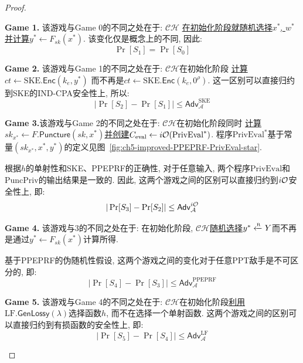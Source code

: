 \begin{proof}
\begin{trivlist}
\item \textbf{Game 1.} 该游戏与Game 0的不同之处在于: $\mathcal{CH}$ 
    \underline{在初始化阶段就随机选择$x^*$, $w^*$并计算$y^* \leftarrow F_{sk}(x^*)$}. 
    该变化仅是概念上的不同, 因此: 
\begin{equation*}
    \Pr[S_1] = \Pr[S_0]
\end{equation*} 

\item \textbf{Game 2.} 该游戏与Game 1的不同之处在于: $\mathcal{CH}$在初始化阶段
    \underline{计算$ct \leftarrow \text{SKE}.\mathsf{Enc}(k_e, y^*)$} 
    而不再是$ct \leftarrow \text{SKE}.\mathsf{Enc}(k_e, 0^\rho)$. 
    这一区别可以直接归约到SKE的IND-CPA安全性上, 所以: 
\begin{equation*}
    |\Pr[S_2] - \Pr[S_1]| \leq \mathsf{Adv}_\mathcal{A}^{\text{SKE}}
\end{equation*}   

\item \textbf{Game 3.}该游戏与Game 2的不同之处在于: $\mathcal{CH}$在初始化阶段同时 
    \underline{计算$sk_{x^*} \leftarrow F.\mathsf{Puncture}(sk, x^*)$并创建$C_\text{eval} \leftarrow i\mathcal{O}(\text{PrivEval}^*)$}. 
    程序$\text{PrivEval}^*$基于常量$(sk_{x^*}, x^*, y^*)$的定义见图~\ref{fig:ch5-improved-PPEPRF-PrivEval-star}. 

    根据$h$的单射性和SKE、PPEPRF的正确性, 
    对于任意输入, 两个程序$\text{PrivEval}$和$\text{PuncPriv}$的输出结果是一致的. 
    因此, 这两个游戏之间的区别可以直接归约到$i\mathcal{O}$安全性上, 即:
\begin{equation*}
    |\Pr[S_3] - \Pr[S_2]| \leq \mathsf{Adv}_\mathcal{A}^{i\mathcal{O}} 
\end{equation*} 

\item \textbf{Game 4.} 该游戏与3的不同之处在于: 在初始化阶段, $\mathcal{CH}$\underline{随机选择$y^* \xleftarrow{\textup{\tiny R}} Y$}而不再是通过$y^* \leftarrow F_{sk}(x^*)$计算所得. 

    基于PPEPRF的伪随机性假设, 这两个游戏之间的变化对于任意PPT敌手是不可区分的, 即: 
\begin{equation*}
    |\Pr[S_4] - \Pr[S_3]| \leq \mathsf{Adv}_\mathcal{A}^{\text{PPEPRF}}
\end{equation*}

\item \textbf{Game 5.} 该游戏与Game 4的不同之处在于: $\mathcal{CH}在初始化阶段$\underline{利用$\text{LF}.\mathsf{GenLossy}(\lambda)$}选择函数$h$, 而不在选择一个单射函数. 
    这两个游戏之间的区别可以直接归约到有损函数的安全性上, 即:
\begin{equation*}
    |\Pr[S_5] - \Pr[S_4]| \leq \mathsf{Adv}_\mathcal{A}^{\text{LF}}
\end{equation*}


\end{trivlist}
\end{proof}

